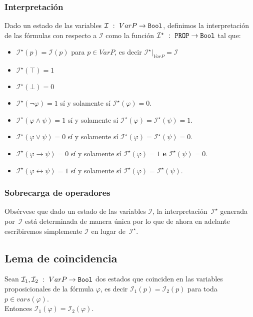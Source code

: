 \documentclass[a4paper]{article}
\begin{document}
\subsubsection{Interpretación}
\noindent
Dado un estado de las variables $\mathcal{I} \ : \ VarP \to \text{\texttt{Bool}}$, 
definimos la interpretación de las fórmulas con respecto a $\mathcal{I}$ como la función
$\mathcal{I}^{\star} \ : \ \text{\texttt{PROP}} \to \text{\texttt{Bool}}$ tal que:
\begin{itemize}
    \item $\mathcal{I}^{\star}(p)=\mathcal{I}(p)$ para $p\in VarP$, es decir
    \(\mathcal{I}^{\star}|_{VarP} = \mathcal{I}\)
    \item $\mathcal{I}^{\star}(\top)=1$
    \item $\mathcal{I}^{\star}(\bot)=0$
    \item $\mathcal{I}^{\star}(\lnot\varphi)=1$ sí y solamente sí $\mathcal{I}^{\star}(\varphi)=0$.
    \item $\mathcal{I}^{\star}(\varphi\land\psi)=1$ sí y solamente sí $\mathcal{I}^{\star}(\varphi)=\mathcal{I}^{\star}(\psi)=1$.
    \item $\mathcal{I}^{\star}(\varphi\lor\psi)=0$ sí y solamente sí $\mathcal{I}^{\star}(\varphi)=\mathcal{I}^{\star}(\psi)=0$.
    \item $\mathcal{I}^{\star}(\varphi \rightarrow \psi)=0$ sí y solamente sí $\mathcal{I}^{\star}(\varphi)=1$ \textbf{e}
      $\mathcal{I}^{\star}(\psi)=0$.
    \item $\mathcal{I}^{\star}(\varphi \leftrightarrow \psi)=1$ sí y solamente sí $\mathcal{I}^{\star}(\varphi)=\mathcal{I}^{\star}(\psi)$. 
\end{itemize}
\subsubsection{Sobrecarga de operadores}
Obsérvese que dado un estado de las variables $\mathcal{I}$, %
la interpretación~$\mathcal{I}^{\star}$ generada por~$\mathcal{I}$ est\'a determinada de manera 
\'unica por lo que de ahora en adelante escribiremos simplemente $\mathcal{I}$ en lugar 
de~$\mathcal{I}^{\star}$.
\subsection{Lema de coincidencia}
\noindent
Sean $\mathcal{I}_1,\mathcal{I}_2 \ : \ VarP \to \text{\texttt{Bool}}$ dos estados que coinciden en las variables 
proposicionales de la fórmula $\varphi$, es decir 
$\mathcal{I}_{1}(p)=\mathcal{I}_2(p)$ para toda $p\in vars(\varphi)$.\\
Entonces $\mathcal{I}_1(\varphi)=\mathcal{I}_2(\varphi)$.
\end{document}
